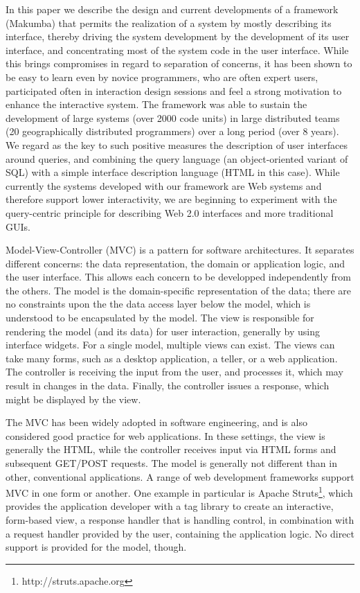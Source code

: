 \documentclass{chi2009}
\begin{document}
In this paper we describe the design and current developments of a framework (Makumba) that permits the realization of a system by mostly describing its interface, thereby driving the system development by the development of its user interface, and concentrating most of the system code in the user interface. While this brings compromises in regard to separation of concerns, it has been shown to be easy to learn even by novice programmers, who are often expert users, participated often in interaction design sessions and feel a strong motivation to enhance the interactive system. The framework was able to sustain the development of large systems (over 2000 code units) in large distributed teams (20 geographically distributed programmers) over a long period (over 8 years). We regard as the key to such positive measures the description of user interfaces around queries, and combining the query language (an object-oriented variant of SQL) with a simple interface description language (HTML in this case). While currently the systems developed with our framework are Web systems and therefore support lower interactivity, we are beginning to experiment with the query-centric principle for describing Web 2.0 interfaces and more traditional GUIs.

Model-View-Controller (MVC) \cite{reenskaug1979mvc1} is a pattern for software architectures. It separates different concerns: the data representation, the domain or application logic, and the user interface. This allows each concern to be developped independently from the others.
The model is the domain-specific representation of the data; there are no constraints upon the the data access layer below the model, which is understood to be encapsulated by the model. The view is responsible for rendering the model (and its data) for user interaction, generally by using interface widgets. For a single model, multiple views can exist. The views can take many forms, such as a desktop application, a teller, or a web application.
The controller is receiving the input from the user, and processes it, which may result in changes in the data. Finally, the controller issues a response, which might be displayed by the view.

The MVC has been widely adopted in software engineering, and is also considered good practice for web applications. In these settings, the view is generally the HTML, while the controller receives input via HTML forms and subsequent GET/POST requests. The model is generally not different than in other, conventional applications. A range of web development frameworks support MVC in one form or another. One example in particular is Apache  Struts\footnote{http://struts.apache.org}, which provides the application developer with a tag library to create an interactive, form-based view, a response handler that is handling control, in combination with a request handler provided by the user, containing the application logic. No direct support is provided for the model, though.
\end{document}
